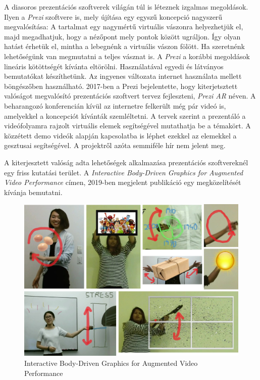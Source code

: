 A diasoros prezentációs szoftverek világán túl is léteznek izgalmas megoldások. 
Ilyen a \textit{Prezi} szoftvere is, mely újítása egy egyszű koncepció nagyszerű megvalósítása: A tartalmat egy nagymértű virtuális vászonra helyezhetjük el, majd megadhatjuk, hogy a nézőpont mely pontok között ugráljon. Így olyan hatást érhetük el, mintha a lebegnénk a virtuális vászon fölött. Ha szeretnénk lehetőségünk van megmutatni a teljes vásznat is. A \textit{Prezi} a korábbi megoldások lineáris kötöttségét kívánta eltörölni. Használatával egyedi és látványos bemutatókat készíthetünk. Az ingyenes változata internet használata mellett böngészőben használható.
2017-ben a Prezi bejelentette, hogy kiterjetsztett valóságot megvalósító prezentációs szoftvert tervez fejleszteni, \textit{Prezi AR} néven. A beharangozó konferencián kívül az internetre felkerült még pár videó is, amelyekkel a koncepciót kívánták szemléltetni. A tervek szerint a prezentáló a videófolyamra rajzolt virtuális elemek segítségével mutathatja be a témakört. A közzétett demo videók alapján kapcsolatba is léphet ezekkel az elemekkel a gesztusai segítségével. A projektről azóta semmiféle hír nem jelent meg.

A kiterjesztett valóság adta lehetőségek alkalmazása prezentációs szoftvereknél egy friss kutatási terület. A \textit{Interactive Body-Driven Graphics for Augmented Video Performance} címen, 2019-ben megjelent publikáció egy megközelítését kívánja bemutatni. \cite{saquib2019interactive}

\begin{figure}[h]
\centering
\includegraphics[width=10truecm, height=7.14truecm]{images/IBDGAVP.png}
\caption{Interactive Body-Driven Graphics for Augmented Video Performance}
\label{fig:ibdgavp}
\end{figure}

